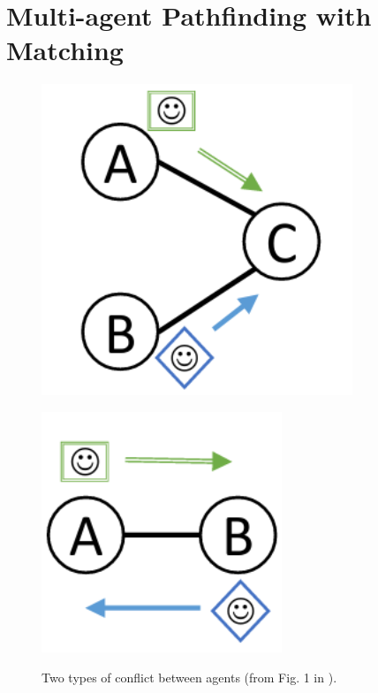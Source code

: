 \documentclass[english]{article}
\begin{document}
	\section{Multi-agent Pathfinding with Matching} %
	\label{mapfm}
	\begin{figure}
		\begin{minipage}{\linewidth}
			\centering\captionsetup[subfigure]{justification=centering}
			\includegraphics[width=\linewidth]{img/vertex-conflict}
			\label{fig:conflictsa}\par\vfill
			\includegraphics[width=0.75\linewidth]{img/edge-conflict}
			\label{fig:conflictsb}
		\end{minipage}
		\vspace{-10pt}
		\caption{Two types of conflict between agents (from Fig. 1 in \cite{stern2019}).}\label{fig:conflicts}
	\end{figure}
	
\end{document}
